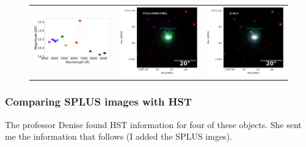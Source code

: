 \documentclass[11pt]{article}
\begin{document}
\begin{figure}[!h]
\begin{tabular}{ccc}
\includegraphics[width=0.3\linewidth, clip]{photopectrum_splus_MC0116-191358_compat-HIIRegions-smc-match-splus_aper.pdf} & \includegraphics[width=0.3\linewidth, clip]{MC0116/MC0116_F861_191358-RGB.pdf} & \includegraphics[width=0.3\linewidth, clip]{MC0116/MC0116_I_191358-RGB.pdf} \\
 \end{tabular}
\caption{}
\end{figure}

\newpage
\subsubsection{Comparing SPLUS images with HST}
\label{sec:hst}
The professor Denise found HST information for four of these objects. She sent me the information that follows (I added the SPLUS imges).


\end{document}

